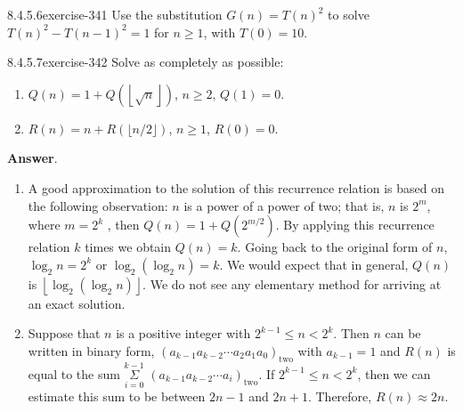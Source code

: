 \documentclass[twoside,10pt,]{book}
\numberwithin{equation}{section}
\begin{document}
\begin{divisionsolution}{8.4.5.6}{}{exercise-341}%
\hypertarget{p-2823}{}%
Use the substitution \(G(n) =T(n)^2\) to solve \(T(n)^2-T(n-1)^2=1\) for \(n \geq  1\), with \(T(0) = 10\).%
\end{divisionsolution}%
\begin{divisionsolution}{8.4.5.7}{}{exercise-342}%
\hypertarget{p-2824}{}%
Solve as completely as possible:%
\par
\hypertarget{p-2825}{}%
\leavevmode%
\begin{enumerate}[label=(\alph*)]
\item\hypertarget{li-1380}{}\hypertarget{p-2826}{}%
\(Q(n)=1+Q\left(\left\lfloor \sqrt{n}\right\rfloor \right)\), \(n \geq  2\), \(Q(1) = 0\).%
\item\hypertarget{li-1381}{}\hypertarget{p-2827}{}%
\(R(n)=n +R(\lfloor n/2\rfloor )\), \(n \geq  1\), \(R(0) = 0\).%
\end{enumerate}
%
\par\smallskip%
\noindent\textbf{Answer}.\quad%
\hypertarget{p-2828}{}%
\leavevmode%
\begin{enumerate}[label=(\alph*)]
\item\hypertarget{li-1382}{}\hypertarget{p-2829}{}%
A good approximation to the solution of this recurrence relation is based on the following observation: \(n\) is a power of a power of two; that is, \(n\) is \(2^m\), where \(m=2^k\) , then \(Q(n)=1+Q\left(2^{m/2}\right)\). By applying this recurrence relation \(k\) times we obtain \(Q(n)=k\). Going back to the original form of \(n\), \(\log _2n=2^k\) or \(\log _2\left(\log _2n\right)=k\). We would expect that in general, \(Q(n)\) is \(\left\lfloor \log _2\left(\log _2n\right)\right\rfloor\). We do not see any elementary method for arriving at an exact solution.%
\item\hypertarget{li-1383}{}\hypertarget{p-2830}{}%
Suppose that \(n\) is a positive integer with \(2^{k-1} \leq n < 2^k\). Then \(n\) can be written in binary form, \(\left(a_{k-1}a_{k-2}\cdots  a_2a_1a_0\right)_{\textrm{two}}\) with \(a_{k-1}=1\) and \(R(n)\) is equal to the sum \(\underset{i=0}{\overset{k-1}{\Sigma }}\) \(\left(a_{k-1}a_{k-2}\cdots  a_i\right)_{\textrm{two}}\). If \(2^{k-1}\leq n < 2^k\), then we can estimate this sum to be between \(2n-1\) and \(2n+1\). Therefore, \(R(n)\approx 2n\).%
\end{enumerate}
%
\end{divisionsolution}%
\end{document}
